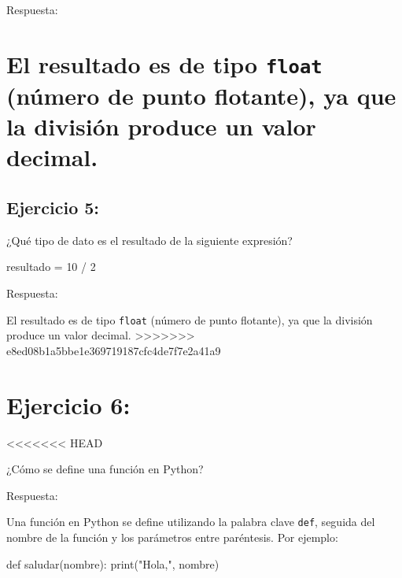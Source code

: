 \documentclass[
  a4paper,
  onepage,
  openany]{scrreprt}
\newenvironment{Shaded}{\begin{snugshade}}{\end{snugshade}}
\newcommand{\BuiltInTok}[1]{\textcolor[rgb]{0.00,0.23,0.31}{#1}}
\newcommand{\DecValTok}[1]{\textcolor[rgb]{0.68,0.00,0.00}{#1}}
\newcommand{\KeywordTok}[1]{\textcolor[rgb]{0.00,0.23,0.31}{#1}}
\newcommand{\NormalTok}[1]{\textcolor[rgb]{0.00,0.23,0.31}{#1}}
\newcommand{\OperatorTok}[1]{\textcolor[rgb]{0.37,0.37,0.37}{#1}}
\newcommand{\StringTok}[1]{\textcolor[rgb]{0.13,0.47,0.30}{#1}}
\begin{document}
Respuesta:

\hypertarget{el-resultado-es-de-tipo-float-nuxfamero-de-punto-flotante-ya-que-la-divisiuxf3n-produce-un-valor-decimal.}{%
\chapter{\texorpdfstring{El resultado es de tipo \texttt{float} (número
de punto flotante), ya que la división produce un valor
decimal.}{El resultado es de tipo float (número de punto flotante), ya que la división produce un valor decimal.}}\label{el-resultado-es-de-tipo-float-nuxfamero-de-punto-flotante-ya-que-la-divisiuxf3n-produce-un-valor-decimal.}}

\hypertarget{ejercicio-5-1}{%
\section{Ejercicio 5:}\label{ejercicio-5-1}}

¿Qué tipo de dato es el resultado de la siguiente expresión?

\begin{Shaded}
\begin{Highlighting}[]
\NormalTok{resultado }\OperatorTok{=} \DecValTok{10} \OperatorTok{/} \DecValTok{2}
\end{Highlighting}
\end{Shaded}

Respuesta:

El resultado es de tipo \texttt{float} (número de punto flotante), ya
que la división produce un valor decimal.
\textgreater\textgreater\textgreater\textgreater\textgreater\textgreater\textgreater{}
e8ed08b1a5bbe1e369719187cfc4de7f7e2a41a9

\hypertarget{ejercicio-6}{%
\chapter{Ejercicio 6:}\label{ejercicio-6}}

\textless\textless\textless\textless\textless\textless\textless{} HEAD

¿Cómo se define una función en Python?

Respuesta:

Una función en Python se define utilizando la palabra clave
\texttt{def}, seguida del nombre de la función y los parámetros entre
paréntesis. Por ejemplo:

\begin{Shaded}
\begin{Highlighting}[]
\KeywordTok{def}\NormalTok{ saludar(nombre):}
    \BuiltInTok{print}\NormalTok{(}\StringTok{"Hola,"}\NormalTok{, nombre)}
\end{Highlighting}
\end{Shaded}
\end{document}

